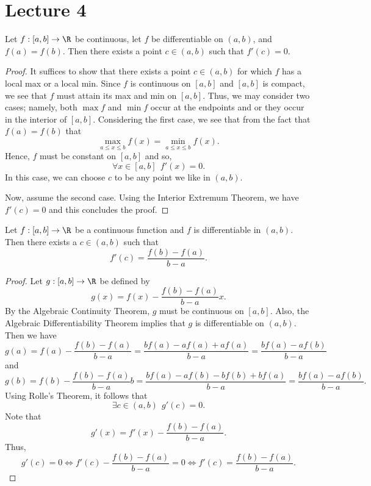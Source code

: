\section{Lecture 4}

\begin{theorem}
    Let \( f: [a,b] \to \R  \) be continuous, let \( f  \) be differentiable on \( (a,b) \), and \( f(a) = f(b) \). Then there exists a point \( c \in (a,b) \) such that \( f'(c) = 0  \). 
\end{theorem}

\begin{proof}
    It suffices to show that there exists a point \( c \in (a,b)  \) for which \( f  \) has a local max or a local min. Since \( f  \) is continuous on \( [a,b] \) and \( [a,b]  \) is compact, we see that \( f  \) must attain its max and min on \( [a,b] \). Thus, we may consider two cases; namely, both \( \max f  \) and \( \min f  \) occur at the endpoints and or they occur in the interior of \( [a,b] \). Considering the first case, we see that from the fact that \( f(a) = f(b) \) that   
    \[  \max_{a \leq x \leq b } f(x) = \min_{a \leq x \leq b } f(x). \]
    Hence, \( f \) must be constant on \( [a,b] \) and so, 
    \[  \forall  x \in [a,b] \ \ f'(x) = 0.  \]
    In this case, we can choose \( c  \) to be any point we like in \( (a,b) \).  

    Now, assume the second case. Using the Interior Extremum Theorem, we have \( f'(c) = 0  \) and this concludes the proof.  
\end{proof}

\begin{theorem}
    Let \( f: [a,b] \to \R  \) be a continuous function and \( f  \) is differentiable in \( (a,b) \). Then there exists a \( c \in (a,b)  \) such that 
    \[  f'(c) = \frac{ f(b) - f(a) }{  b - a  }. \]
\end{theorem}
\begin{proof}
    Let \( g:[a,b] \to \R  \) be defined by
    \[  g(x) = f(x) - \frac{ f(b) - f(a)  }{  b - a  }  x.  \]
    By the Algebraic Continuity Theorem, \( g  \) must be continuous on \( [a,b] \). Also, the Algebraic Differentiability Theorem implies that \( g  \) is differentiable on \( (a,b) \). Then we have  
    \[  g(a) = f(a) - \frac{ f(b) - f(a) }{  b -a  } = \frac{ b f(a) - a f(a) + a f(a)  }{  b - a  }  = \frac{ bf(a) - a f(b)  }{  b - a  }  \]
    and 
    \[  g(b) = f(b) - \frac{ f(b) - f(a) }{ b - a  } b = \frac{ b f(a) - a f(b) - b f(b) + b f(a) }{  b -a   }  = \frac{ b f(a) - a f(b)  }{  b -a  }. \]
    Using Rolle's Theorem, it follows that 
    \[  \exists c \in (a,b) \ \ g'(c) = 0.  \]
    Note that 
    \[  g'(x) = f'(x) - \frac{ f(b) - f(a) }{ b - a  }. \]
    Thus, 
    \[  g'(c) = 0  \iff f'(c) - \frac{ f(b) - f(a) }{  b -a  }  = 0  \iff f'(c) = \frac{ f(b) -f(a)  }{ b - a  }. \]
\end{proof}  


